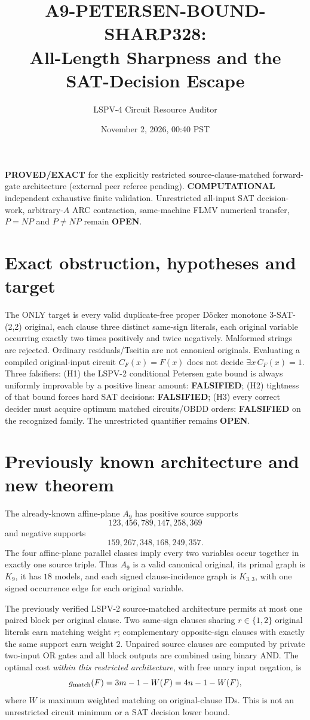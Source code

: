 \documentclass[11pt]{article}
\title{A9-PETERSEN-BOUND-SHARP328:\\All-Length Sharpness and the SAT-Decision Escape}
\author{LSPV-4 Circuit Resource Auditor}
\date{November 2, 2026, 00:40 PST}
\begin{document}
\maketitle
\noindent\textbf{PROVED/EXACT} for the explicitly restricted source-clause-matched forward-gate architecture (external peer referee pending). \textbf{COMPUTATIONAL} independent exhaustive finite validation. Unrestricted all-input SAT decision-work, arbitrary-$A$ ARC contraction, same-machine FLMV numerical transfer, $P=NP$ and $P\neq NP$ remain \textbf{OPEN}.
\section{Exact obstruction, hypotheses and target}
The ONLY target is every valid duplicate-free proper D\"ocker monotone 3-SAT-(2,2) original, each clause three distinct same-sign literals, each original variable occurring exactly two times positively and twice negatively. Malformed strings are rejected. Ordinary residuals/Tseitin are not canonical originals. Evaluating a compiled original-input circuit $C_F(x)=F(x)$ does not decide $\exists x\,C_F(x)=1$. Three falsifiers: (H1) the LSPV-2 conditional Petersen gate bound is always uniformly improvable by a positive linear amount: \textbf{FALSIFIED}; (H2) tightness of that bound forces hard SAT decisions: \textbf{FALSIFIED}; (H3) every correct decider must acquire optimum matched circuits/OBDD orders: \textbf{FALSIFIED} on the recognized family. The unrestricted quantifier remains \textbf{OPEN}.
\section{Previously known architecture and new theorem}
The already-known affine-plane $A_9$ has positive source supports
\[
123,456,789,147,258,369
\]
and negative supports
\[
159,267,348,168,249,357.
\]
The four affine-plane parallel classes imply every two variables occur together in exactly one source triple. Thus $A_9$ is a valid canonical original, its primal graph is $K_9$, it has $18$ models, and each signed clause-incidence graph is $K_{3,3}$, with one signed occurrence edge for each original variable.

The previously verified LSPV-2 source-matched architecture permits at most one paired block per original clause. Two same-sign clauses sharing $r\in\{1,2\}$ original literals earn matching weight $r$; complementary opposite-sign clauses with exactly the same support earn weight $2$. Unpaired source clauses are computed by private two-input OR gates and all block outputs are combined using binary AND. The optimal cost \emph{within this restricted architecture}, with free unary input negation, is
\[
g_{\rm match}(F)=3m-1-W(F)=4n-1-W(F),
\]
where $W$ is maximum weighted matching on original-clause IDs. This is not an unrestricted circuit minimum or a SAT decision lower bound.
\end{document}
